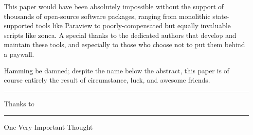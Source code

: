 \documentclass[paper.tex]{subfiles}
\begin{document}
\begin{multicols}{1}
This paper would have been absolutely impossible without the support of thousands of open-source software packages, ranging from monolithic state-supported tools like Paraview to poorly-compensated but equally invaluable scripts like zonca. A special thanks to the dedicated authors that develop and maintain these tools, and especially to those who choose not to put them behind a paywall.

Hamming be damned; despite the name below the abstract, this paper is of course entirely the result of circumstance, luck, and awesome friends. 

\rule{\linewidth}{0.2pt}

Thanks to

\rule{\linewidth}{0.2pt}


\end{multicols}

One Very Important Thought


\end{document}
